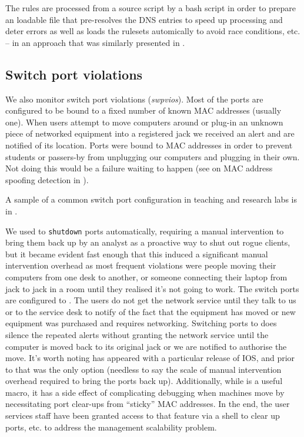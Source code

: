 The rules are processed from a source script by a bash script in order
to prepare an  loadable file that pre-resolves
the DNS entries to speed up processing and deter errors as well as loads
the rulesets automically to avoid race conditions, etc. -- in an approach
that was similarly presented in \cite{iptables-atomic-changes-2010}.

\subsection{Switch port violations}
\label{sect:swpvios}

We also monitor switch port violations ({\em swpvios}).
Most of the ports are configured to be bound to a fixed number of
known MAC addresses (usually one). When users attempt to move computers
around or plug-in an unknown piece of networked equipment into a registered
jack we received an alert and
are notified of its location.
Ports were bound to MAC addresses in order to prevent students or
passers-by from unplugging our computers and plugging in their own.
Not doing this would be a failure waiting to happen (see on MAC address
spoofing detection in ).

A sample of a common switch port configuration in teaching and research labs
is in .

We used to \texttt{shutdown} ports automatically, requiring a manual
intervention to bring them back up by an analyst as a proactive way
to shut out
rogue clients, but it became evident
fast enough that this induced a significant manual intervention overhead
as most frequent violations were people moving their computers
from one desk to another,
or someone connecting their laptop from jack to jack in
a room until they realised it's not going to work.
The switch ports are configured to .
The users do not get the network service until they talk to us or
to the service desk to notify of the fact that the equipment has moved
or new equipment was purchased and requires networking.
Switching ports to  does silence the repeated
alerts without granting the network service until the computer
is moved back to its original jack or we are notified to authorise
the move.
It's worth noting  has appeared with a particular
release of IOS, and prior to that  was the only
option (needless to say the scale of manual intervention overhead required
to bring the ports back up). Additionally, while 
is a useful macro, it has a side effect of
complicating debugging when machines move by necessitating port clear-ups
from ``sticky'' MAC addresses. In the end, the user services staff have been granted access to
that feature via a shell to clear up ports, etc. to address the management scalability
problem.

